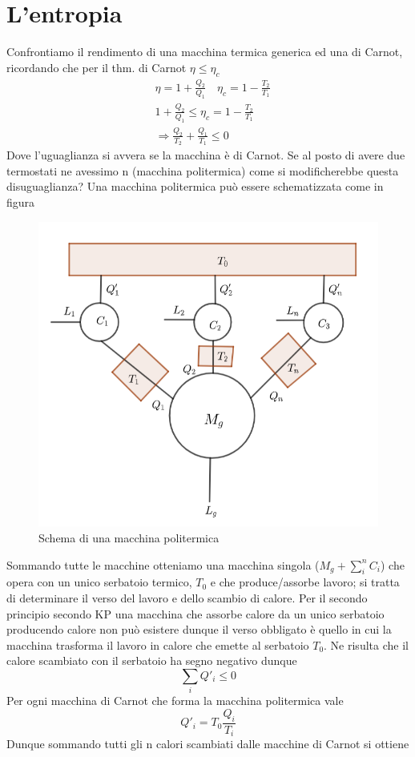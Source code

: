 \documentclass[10pt,a4paper]{article}
\begin{document}
\section{L'entropia}
Confrontiamo il rendimento di una macchina termica generica ed una di Carnot, ricordando che per il thm. di Carnot \(\eta \leq \eta_c\)
\begin{align*}
	&\eta = 1 + \frac{Q_2}{Q_1} \quad \eta_c = 1 - \frac{T_2}{T_1}\\
	&1 + \frac{Q_2}{Q_1} \leq \eta_c = 1 - \frac{T_2}{T_1}\\
	&\Rightarrow \frac{Q_2}{T_2}+\frac{Q_1}{T_1}\leq 0
\end{align*}
Dove l'uguaglianza si avvera se la macchina è di Carnot. Se al posto di avere due termostati ne avessimo n (macchina politermica) come si modificherebbe questa disuguaglianza? Una macchina politermica può essere schematizzata come in figura
\begin{figure}[h!]
	\centering
	\includegraphics[width=0.6\linewidth]{../images/macchina_polit}
	\caption{Schema di una macchina politermica}
	\label{fig:macchinapolit}
\end{figure}
\FloatBarrier
Sommando  tutte le macchine otteniamo una macchina singola (\(M_g+\sum_i^n C_i\)) che opera con un unico serbatoio termico, \(T_0\) e che produce/assorbe lavoro; si tratta di determinare il verso del lavoro e dello scambio di calore. Per il secondo principio secondo KP una macchina che assorbe calore da un unico serbatoio producendo calore non può esistere dunque il verso obbligato è quello in cui la macchina trasforma il lavoro in calore che emette al serbatoio \(T_0\). Ne risulta che il calore scambiato con il serbatoio ha segno negativo dunque 
\[\sum_i Q'_i \leq 0\]
Per ogni macchina di Carnot che forma la macchina politermica vale 
\[Q'_i = T_0 \frac{Q_i}{T_i}\]
Dunque sommando tutti gli n calori scambiati dalle macchine di Carnot si ottiene
\end{document}
